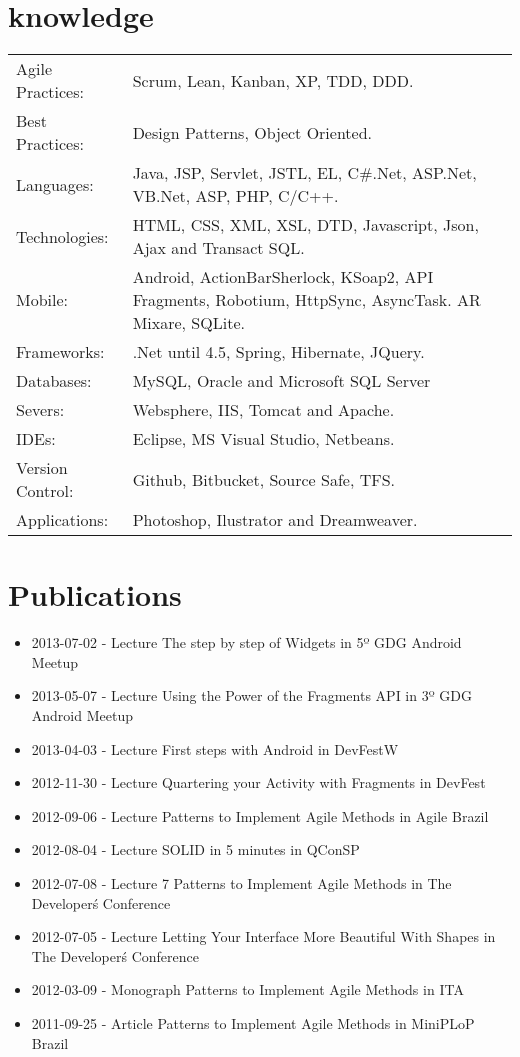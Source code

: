 \documentclass[a4paper, oneside, final]{article}
\begin{document}
\begin{center}
\section{knowledge}

\begin{tabularx}{0.97\linewidth}{p{3.0cm}X}
Agile Practices: & Scrum, Lean, Kanban, XP, TDD, DDD.\\
Best Practices:  & Design Patterns, Object Oriented.\\
Languages:       & Java, JSP, Servlet, JSTL, EL, C\#.Net, ASP.Net, VB.Net, ASP, PHP, C/C++.\\
Technologies:    & HTML, CSS, XML, XSL, DTD, Javascript, Json, Ajax and Transact SQL.\\
Mobile:          & Android, ActionBarSherlock, KSoap2, API Fragments, Robotium, HttpSync, AsyncTask. AR Mixare, SQLite.\\
Frameworks:      & .Net until 4.5, Spring, Hibernate, JQuery.\\
Databases:       & MySQL, Oracle and Microsoft SQL Server \\
Severs:          & Websphere, IIS, Tomcat and Apache.\\
IDEs:            & Eclipse, MS Visual Studio, Netbeans.\\
Version Control: & Github, Bitbucket, Source Safe, TFS.\\
Applications:    & Photoshop, Ilustrator and Dreamweaver.\\
\end{tabularx}

\section{Publications}
\begin{itemize}
	\item 2013-07-02 - Lecture The step by step of Widgets in 5º GDG Android Meetup
	\item 2013-05-07 - Lecture Using the Power of the Fragments API in 3º GDG Android Meetup
	\item 2013-04-03 - Lecture First steps with Android in DevFestW
	\item 2012-11-30 - Lecture Quartering your Activity with Fragments in DevFest
	\item 2012-09-06 - Lecture Patterns to Implement Agile Methods in Agile Brazil
	\item 2012-08-04 - Lecture SOLID in 5 minutes in QConSP
	\item 2012-07-08 - Lecture 7 Patterns to Implement Agile Methods in The Developer\'s Conference
	\item 2012-07-05 - Lecture Letting Your Interface More Beautiful With Shapes in The Developer\'s Conference
	\item 2012-03-09 - Monograph Patterns to Implement Agile Methods in ITA
	\item 2011-09-25 - Article Patterns to Implement Agile Methods in MiniPLoP Brazil
\end{itemize}


\end{center}
\end{document}
